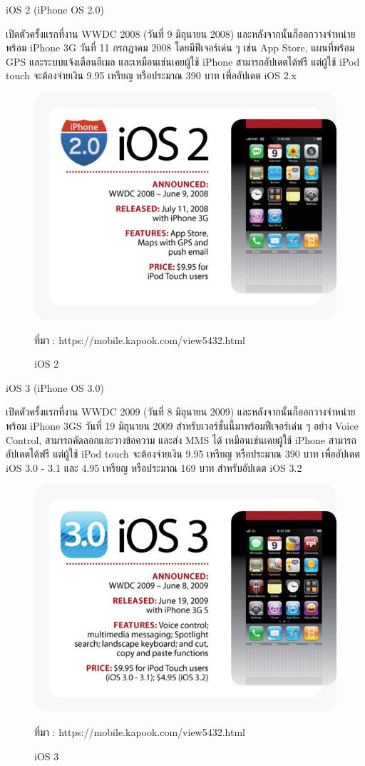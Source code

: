 	iOS 2 (iPhone OS 2.0)

	เปิดตัวครั้งแรกที่งาน WWDC 2008 (วันที่ 9 มิถุนายน 2008) และหลังจากนั้นก็ออกวางจำหน่ายพร้อม iPhone 3G วันที่ 11 กรกฎาคม 2008 โดยมีฟีเจอร์เด่น ๆ เช่น App Store, แผนที่พร้อม GPS และระบบแจ้งเตือนอีเมล และเหมือนเช่นเคยผู้ใช้ iPhone สามารถอัปเดตได้ฟรี แต่ผู้ใช้ iPod touch จะต้องจ่ายเงิน 9.95 เหรียญ หรือประมาณ 390 บาท เพื่ออัปเดต iOS 2.x

	\begin{figure}[H]
		\centering
		\includegraphics[width=0.8\columnwidth]{Figures/2/iOS/iOS2}
		\caption{iOS 2}{ที่มา : https://mobile.kapook.com/view5432.html}
		\label{Fig:iosversion2}
	\end{figure}

	iOS 3 (iPhone OS 3.0)

	เปิดตัวครั้งแรกที่งาน WWDC 2009 (วันที่ 8 มิถุนายน 2009) และหลังจากนั้นก็ออกวางจำหน่ายพร้อม iPhone 3GS วันที่ 19 มิถุนายน 2009 สำหรับเวอร์ชั่นนี้มาพร้อมฟีเจอร์เด่น ๆ อย่าง Voice Control, สามารถคัดลอกและวางข้อความ และส่ง MMS ได้ เหมือนเช่นเคยผู้ใช้ iPhone สามารถอัปเดตได้ฟรี แต่ผู้ใช้ iPod touch จะต้องจ่ายเงิน 9.95 เหรียญ หรือประมาณ 390 บาท เพื่ออัปเดต iOS 3.0 - 3.1 และ 4.95 เหรียญ หรือประมาณ 169 บาท สำหรับอัปเดต iOS 3.2

	\begin{figure}[H]
		\centering
		\includegraphics[width=0.8\columnwidth]{Figures/2/iOS/iOS3}
		\caption{iOS 3}{ที่มา : https://mobile.kapook.com/view5432.html}
		\label{Fig:iosversion3}
	\end{figure}

